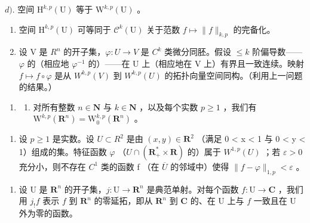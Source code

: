 \(d)\). 空间 \(\mathrm{H}^{k,p}(\mathrm{U})\) 等于 \(\mathrm{W}^{k,p}(\mathrm{U})\) 。

\begin{enumerate}
\def\labelenumi{\alph{enumi})}
\setcounter{enumi}{4}
\item
  空间 \(\mathrm{H}^{k,p}(\mathrm{U})\) 可等同于 \(\mathcal{C}^{k}(\mathrm{U})\) 关于范数 \(f \mapsto \|f\|_{k,p}\) 的完备化。
\item
  设 V 是 \(R^{n}\) 的开子集，\(\varphi\colon U\to V\) 是 \(C^{k}\) 类微分同胚。假设 \(\leqslant k\) 阶偏导数——\(\varphi\) 的（相应地 \(\varphi^{-1}\) 的）——在 U 上（相应地在 V 上）有界且一致连续。映射 \(f\mapsto f\circ\varphi\) 是从 \(W^{k,p}(V)\) 到 \(W^{k,p}(U)\) 的拓扑向量空间同构。（利用上一问题的结果。）
\end{enumerate}

\begin{enumerate}
\def\labelenumi{\arabic{enumi})}
\setcounter{enumi}{11}
\tightlist
\item
  \begin{enumerate}
  \def\labelenumii{\alph{enumii})}
  \tightlist
  \item
    对所有整数 \(n \in \mathbf{N}\) 与 \(k \in \mathbf{N}\) ，以及每个实数 \(p \geqslant 1\) ，我们有 \(\mathrm{W}^{k,p}(\mathbf{R}^n) = \mathrm{W}_0^{k,p}(\mathbf{R}^n)\) 。
  \end{enumerate}
\end{enumerate}

\begin{enumerate}
\def\labelenumi{\alph{enumi})}
\setcounter{enumi}{1}
\tightlist
\item
  设 \(p \geqslant 1\) 是实数。设 \(U \subset R^{2}\) 是由 \((x, y) \in \mathbf{R}^{2}\) （满足 0 \textless{} \textbar x\textbar{} \textless{} 1 与 0 \textless{} y \textless{} 1）组成的集。特征函数 \(\varphi\) （\(U \cap (\mathbf{R}_{+}^{*} \times \mathbf{R})\) 的）属于 \(W^{1,p}(U)\) ；若 \(\varepsilon > 0\) 充分小，则不存在 \(C^{1}\) 类的函数 f （在 \(\overline{U}\) 的邻域中）使得 \(\|f - \varphi\|_{1,p} < \varepsilon\) 。
\end{enumerate}

\begin{enumerate}
\def\labelenumi{\arabic{enumi})}
\setcounter{enumi}{12}
\tightlist
\item
  设 U 是 \(\mathbf{R}^n\) 的开子集，\(j\colon \mathrm{U}\to \mathbf{R}^n\) 是典范单射。对每个函数 \(f\colon \mathrm{U}\to \mathbf{C}\) ，我们用 \(j_{!}f\) 表示 \(f\) 到 \(\mathbf{R}^n\) 的零延拓，即从 \(\mathbf{R}^n\) 到 \(\mathbf{C}\) 的、在 U 上与 \(f\) 一致且在 U 外为零的函数。
\end{enumerate}

